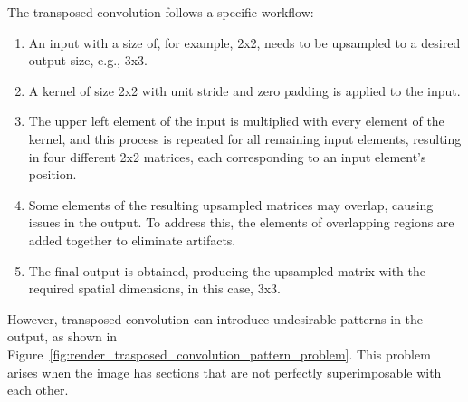 The transposed convolution follows a specific workflow:
\begin{enumerate}
\item An input with a size of, for example, 2x2, needs to be upsampled to a desired output size, e.g., 3x3.
\item A kernel of size 2x2 with unit stride and zero padding is applied to the input.
\item The upper left element of the input is multiplied with every element of the kernel, and this process is repeated for all remaining input elements, resulting in four different 2x2 matrices, each corresponding to an input element's position.
\item Some elements of the resulting upsampled matrices may overlap, causing issues in the output. To address this, the elements of overlapping regions are added together to eliminate artifacts.
\item The final output is obtained, producing the upsampled matrix with the required spatial dimensions, in this case, 3x3.
\end{enumerate}

However, transposed convolution can introduce undesirable patterns in the output, as shown in Figure~\ref{fig:render_trasposed_convolution_pattern_problem}. This problem arises when the image has sections that are not perfectly superimposable with each other.

